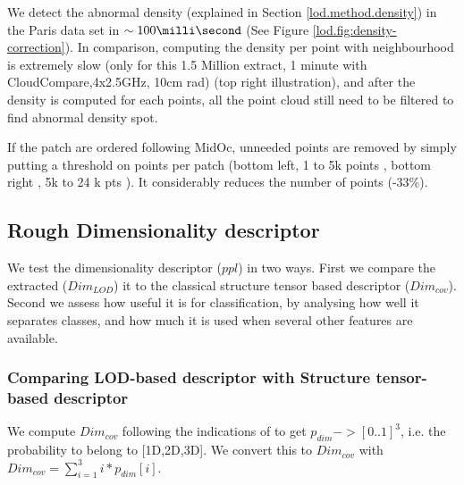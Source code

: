 		We detect the abnormal density (explained in Section \ref{lod.method.density}) in the Paris data set in $\sim 100 \milli \second$ 
		(See Figure \ref{lod.fig:density-correction}). 
		In comparison, computing the density per point with neighbourhood is extremely slow (only for this 1.5 Million extract, 1 minute with CloudCompare,4x2.5GHz, 10cm rad) (top right illustration), and after the density is computed for each points, all the point cloud still need to be filtered to find abnormal density spot.
		
		If the patch are ordered following MidOc, unneeded points are removed by simply putting a threshold on points per patch (bottom left, 1 to 5k points \per \cubic \meter , bottom right , 5k to 24 k pts \per \cubic \meter). It considerably reduces the number of points (-33\%). 
	
	\subsection{Rough Dimensionality descriptor}
		\label{lod.result.dim_descriptor}
		We test the dimensionality descriptor ($ppl$) in two ways.
		First we compare the extracted ($Dim_{LOD}$) it to the classical structure tensor based descriptor ($Dim_{cov}$).
		Second we assess how useful it is for classification, 
		by analysing how well it separates classes, and how much it is used when 
		several other features are available.
		
		\subsubsection{Comparing LOD-based descriptor with Structure tensor-based descriptor}
		We compute $Dim_{cov}$ following the indications of \cite{Weinmann2015} to get $p_{dim}->[0..1]^3$, i.e. the probability to belong to [1D,2D,3D].
		We convert this to $Dim_{cov}$ with $Dim_{cov}=\sum_{i=1}^{3}{i*p_{dim}[i]}$.
		

